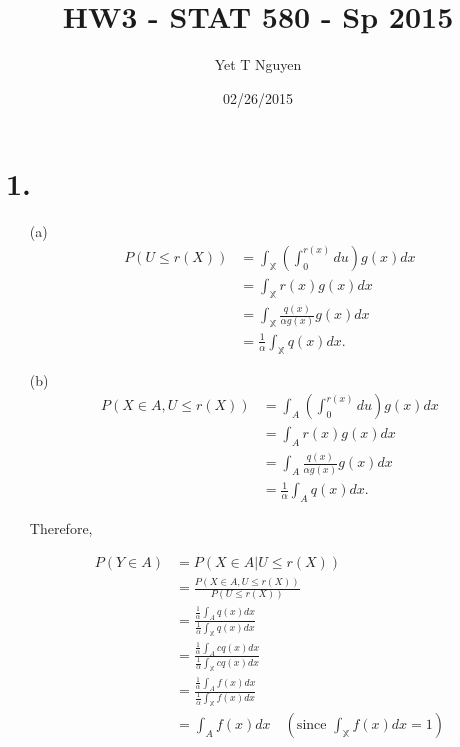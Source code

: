 \documentclass{article}\usepackage[]{graphicx}\usepackage[]{color}
\begin{document}
\title{\color{red}HW3 - STAT 580 - Sp 2015}
\author{Yet T Nguyen}
\date{02/26/2015}
\maketitle

\section*{1.}
\begin{itemize}
\item [(a)] 
\begin{align*}
P(U \leq r(X)) & = \int_\mathbb{X} \left(\int_0^{r(x)} du\right) g(x) dx\\
               & = \int_\mathbb{X} r(x)g(x)dx\\
               & = \int_\mathbb{X}\frac{q(x)}{\alpha g(x)}g(x) dx \\
               & = \frac{1}{\alpha}\int_\mathbb{X}q(x)dx.
\end{align*}


\item [(b)] 
\begin{align*}
P(X\in A, U \leq r(X)) & = \int_{A} \left(\int_0^{r(x)} du\right) g(x) dx\\
               & = \int_{A} r(x)g(x)dx\\
               & = \int_{A}\frac{q(x)}{\alpha g(x)}g(x) dx \\
               & = \frac{1}{\alpha}\int_{A}q(x)dx.
\end{align*}

Therefore, 

\begin{align*}
P(Y\in  A) &= P(X\in A|U\leq r(X)) \\
           &= \frac{P(X\in A, U \leq r(X))}{P(U \leq r(X))}\\
           &=\frac{\frac{1}{\alpha}\int_{A}q(x)dx}{\frac{1}{\alpha}\int_\mathbb{X}q(x)dx}\\
           &=\frac{\frac{1}{\alpha}\int_{A}cq(x)dx}{\frac{1}{\alpha}\int_\mathbb{X}cq(x)dx}\\ 
           &=\frac{\frac{1}{\alpha}\int_{A}f(x)dx}{\frac{1}{\alpha}\int_\mathbb{X}f(x)dx}\\ 
           &=\int_A f(x)dx \quad (\mbox{since } \int_\mathbb{X}f(x)dx = 1)
\end{align*}
\end{itemize}
\end{document}
